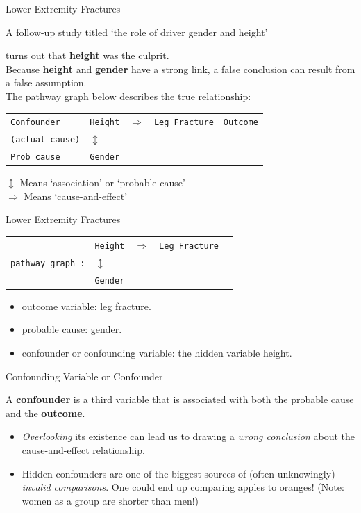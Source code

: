 \documentclass[14pt]{beamer}\usepackage[]{graphicx}\usepackage[]{color}
\begin{document}
\begin{frame}[fragile]{Lower Extremity Fractures}

{\small{
A follow-up study titled `the role of driver gender and height'

turns out that \textbf{height} was the culprit.\\
Because \textbf{height} and \textbf{gender} have a strong link, a false conclusion  can result from a false assumption.\\
The pathway graph below describes the true relationship:

\vspace{3mm}

\begin{tabular}{@{} lllll @{}} 
\texttt{Confounder} & \texttt{Height} & $\Rightarrow$ & \texttt{Leg Fracture} & \texttt{Outcome} \\
\texttt{(actual cause)} & $\updownarrow$ &  & \\
\texttt{Prob cause} &\texttt{Gender} & &
\end{tabular}

\vspace{3mm}

$\updownarrow$  Means `association' or `probable cause' \\
$\Rightarrow$  Means `cause-and-effect'
}}
\end{frame}

\begin{frame}[fragile]{Lower Extremity Fractures}

\begin{tabular}{@{} lllll @{}} 
 & \texttt{Height} & $\Rightarrow$ & \texttt{Leg Fracture}  \\
\texttt{pathway graph :} & $\updownarrow$ &  & \\
 &\texttt{Gender} & &
\end{tabular}

\begin{itemize}
\item outcome variable: leg fracture.
\item probable cause: gender.
\item confounder or confounding variable: the hidden variable height.
\end{itemize}
\end{frame}

\begin{frame}[fragile]{Confounding Variable or Confounder}

A \textbf{confounder} is a third variable that is associated with both the probable cause and  the \textbf{outcome}.

\begin{itemize}
\item \textit{Overlooking} its existence can lead us to drawing a \textit{wrong  conclusion} about the cause-and-effect relationship.
\item Hidden confounders are one of the biggest sources of (often  unknowingly) \textit{invalid comparisons}. One could end up comparing  apples to oranges! (Note: women as a group are shorter than men!)
\end{itemize}
\end{frame}
\end{document}
